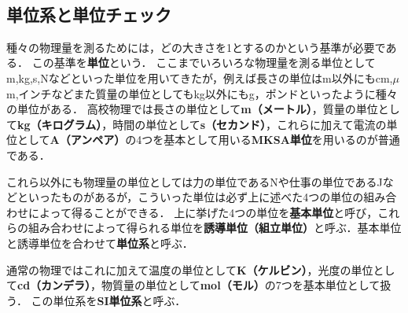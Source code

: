% 
%

 \ 
  \subsection{単位系と単位チェック}

種々の物理量を測るためには，どの大きさを1とするのかという基準が必要である．
この基準を{\bf 単位}という．
ここまでいろいろな物理量を測る単位としてm,kg,s,Nなどといった単位を用いてきたが，例えば長さの単位はm以外にもcm,$\mu$m,インチなどまた質量の単位としてもkg以外にもg，ポンドといったように種々の単位がある．
高校物理では長さの単位として{\bf m（メートル）}，質量の単位として{\bf kg（キログラム）}，時間の単位として{\bf s（セカンド）}，これらに加えて電流の単位として{\bf A（アンペア）}の4つを基本として用いる{\bf MKSA単位}を用いるのが普通である．

これら以外にも物理量の単位としては力の単位であるNや仕事の単位であるJなどといったものがあるが，こういった単位は必ず上に述べた4つの単位の組み合わせによって得ることができる．
上に挙げた4つの単位を{\bf 基本単位}と呼び，これらの組み合わせによって得られる単位を{\bf 誘導単位（組立単位）}と呼ぶ．基本単位と誘導単位を合わせて{\bf 単位系}と呼ぶ．

通常の物理ではこれに加えて温度の単位として{\bf K（ケルビン）}，光度の単位として{\bf cd（カンデラ）}，物質量の単位として{\bf mol（モル）}の7つを基本単位として扱う．
この単位系を{\bf SI単位系}と呼ぶ．

